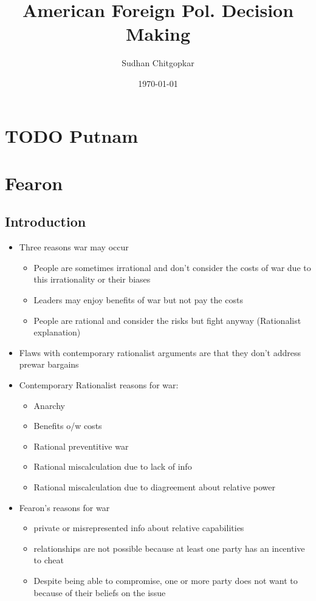 \documentclass[11pt]{article}
\author{Sudhan Chitgopkar}
\date{\today}
\title{American Foreign Pol. Decision Making}
\begin{document}
\maketitle
\tableofcontents \clearpage\section{{\bfseries\sffamily TODO} Putnam}
\label{sec:org703f174}

\section{Fearon}
\label{sec:orgbe24207}
\subsection{Introduction}
\label{sec:org9461ea1}
\begin{itemize}
\item Three reasons war may occur
\begin{itemize}
\item People are sometimes irrational and don't consider the costs of war due to this irrationality or their biases
\item Leaders may enjoy benefits of war but not pay the costs
\item People are rational and consider the risks but fight anyway (Rationalist explanation)
\end{itemize}
\item Flaws with contemporary rationalist arguments are that they don't address prewar bargains
\item Contemporary Rationalist reasons for war:
\begin{itemize}
\item Anarchy
\item Benefits o/w costs
\item Rational preventitive war
\item Rational miscalculation due to lack of info
\item Rational miscalculation due to diagreement about relative power
\end{itemize}
\item Fearon's reasons for war
\begin{itemize}
\item private or misrepresented info about relative capabilities
\item relationships are not possible because at least one party has an incentive to cheat
\item Despite being able to compromise, one or more party does not want to because of their beliefs on the issue
\end{itemize}
\end{itemize}
\end{document}

